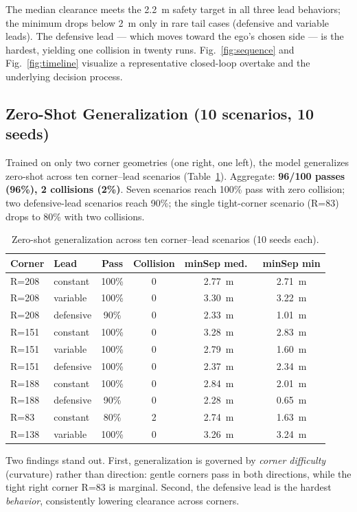 \documentclass[conference]{IEEEtran}
\begin{document}
The median clearance meets the 2.2~m safety target in all three lead behaviors;
the minimum drops below 2~m only in rare tail cases (defensive and variable
leads). The defensive lead --- which moves toward the ego's chosen side --- is
the hardest, yielding one collision in twenty runs. Fig.~\ref{fig:sequence} and
Fig.~\ref{fig:timeline} visualize a representative closed-loop overtake and the
underlying decision process.

\subsection{Zero-Shot Generalization (10 scenarios, 10 seeds)}
Trained on only two corner geometries (one right, one left), the model
generalizes zero-shot across ten corner--lead scenarios (Table~\ref{tab:zero}).
Aggregate: \textbf{96/100 passes (96\%), 2 collisions (2\%)}. Seven scenarios
reach 100\% pass with zero collision; two defensive-lead scenarios reach 90\%;
the single tight-corner scenario (R=83) drops to 80\% with two collisions.

\begin{table}[t]
\centering
\caption{Zero-shot generalization across ten corner--lead scenarios (10 seeds
each).}
\label{tab:zero}
\begin{tabular}{llcccc}
\toprule
Corner & Lead & Pass & Collision & minSep med.\ & minSep min \\
\midrule
R=208 & constant & 100\% & 0 & 2.77~m & 2.71~m \\
R=208 & variable & 100\% & 0 & 3.30~m & 3.22~m \\
R=208 & defensive & 90\% & 0 & 2.33~m & 1.01~m \\
R=151 & constant & 100\% & 0 & 3.28~m & 2.83~m \\
R=151 & variable & 100\% & 0 & 2.79~m & 1.60~m \\
R=151 & defensive & 100\% & 0 & 2.37~m & 2.34~m \\
R=188 & constant & 100\% & 0 & 2.84~m & 2.01~m \\
R=188 & defensive & 90\% & 0 & 2.28~m & 0.65~m \\
R=83 & constant & 80\% & 2 & 2.74~m & 1.63~m \\
R=138 & variable & 100\% & 0 & 3.26~m & 3.24~m \\
\bottomrule
\end{tabular}
\end{table}

Two findings stand out. First, generalization is governed by \emph{corner
difficulty} (curvature) rather than direction: gentle corners pass in both
directions, while the tight right corner R=83 is marginal. Second, the defensive
lead is the hardest \emph{behavior}, consistently lowering clearance across
corners.
\end{document}
